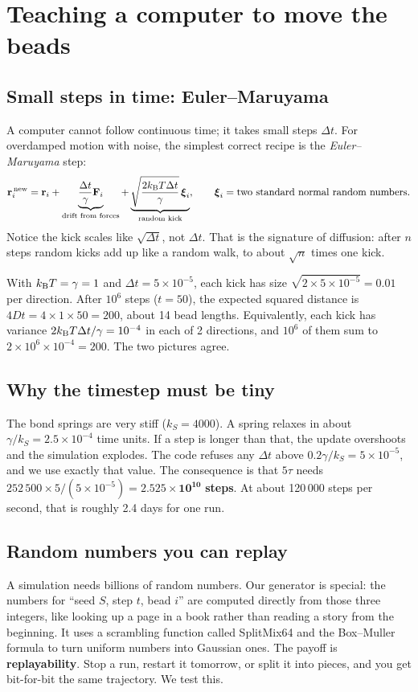 \documentclass[11pt]{article}
\begin{document}
\section{Teaching a computer to move the beads}
\subsection{Small steps in time: Euler--Maruyama}
A computer cannot follow continuous time; it takes small steps $\Delta t$. For overdamped motion with noise, the simplest correct recipe is the
\emph{Euler--Maruyama} step:
\begin{equation}
\mathbf{r}_i^{\,\mathrm{new}}=\mathbf{r}_i+\underbrace{\frac{\Delta t}{\gamma}\mathbf{F}_i}_{\text{drift from forces}}+\underbrace{\sqrt{\frac{2k_{\mathrm{B}}T\Delta t}{\gamma}}\,\boldsymbol\xi_i}_{\text{random kick}},\qquad \boldsymbol\xi_i=\text{two standard normal random numbers}.
\end{equation}
Notice the kick scales like $\sqrt{\Delta t}$, not $\Delta t$. That is the signature of diffusion: after $n$ steps random kicks add up like a random walk, to about $\sqrt{n}$ times one kick.

\begin{notebox}[title=Worked example: one free bead]
With $k_{\mathrm{B}}T=\gamma=1$ and $\Delta t=5\times10^{-5}$, each kick has size $\sqrt{2\times5\times10^{-5}}=0.01$ per direction. After $10^6$ steps ($t=50$),
the expected squared distance is $4Dt=4\times1\times50=200$, about 14 bead lengths. Equivalently, each kick has variance $2k_{\mathrm{B}}T\Delta t/\gamma=10^{-4}$ in each of 2 directions, and $10^6$ of them sum to $2\times10^6\times10^{-4}=200$. The two pictures agree.
\end{notebox}

\subsection{Why the timestep must be tiny}
The bond springs are very stiff ($k_S=4000$). A spring relaxes in about $\gamma/k_S=2.5\times10^{-4}$ time units. If a step is longer than that, the update overshoots and the simulation explodes.
The code refuses any $\Delta t$ above $0.2\gamma/k_S=5\times10^{-5}$, and we use exactly that value. The consequence is that $5\tau$ needs $252\,500\times5/(5\times10^{-5})=\mathbf{2.525\times10^{10}}$ \textbf{steps}.
At about 120\,000 steps per second, that is roughly 2.4 days for one run.

\subsection{Random numbers you can replay}
A simulation needs billions of random numbers. Our generator is special: the numbers for ``seed $S$, step $t$, bead $i$'' are computed directly from those three integers,
like looking up a page in a book rather than reading a story from the beginning. It uses a scrambling function called SplitMix64 and the Box--Muller formula to turn uniform numbers into Gaussian ones.
The payoff is \textbf{replayability}. Stop a run, restart it tomorrow, or split it into pieces, and you get bit-for-bit the same trajectory. We test this.
\end{document}
